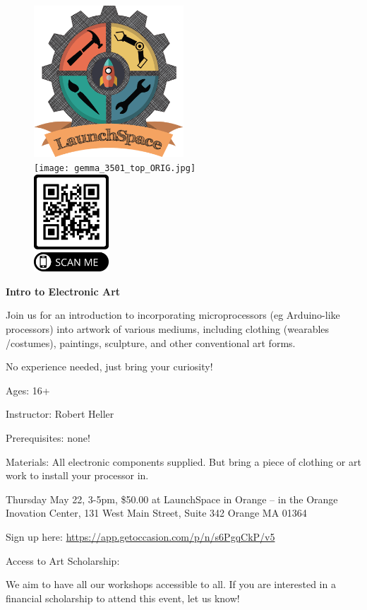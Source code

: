 \documentclass[12pt]{article}
\begin{document}
\begin{figure}
\centering
\includegraphics[width=0.5\textwidth]{Copy-of-launchSpace_Color-copy.png}\\
\vspace{12pt}
\texttt{[image: gemma\_3501\_top\_ORIG.jpg]}\\
\vspace{12pt}
\includegraphics[width=0.25\textwidth]{LaunchSpaceGemmaClass.png}
\end{figure}


{\LARGE \textbf{Intro to Electronic Art\\}}
 
{\Large

Join us for an introduction to incorporating microprocessors (eg Arduino-like 
processors) into artwork of various mediums, including clothing (wearables /costumes), paintings, sculpture, and other conventional art forms. 

No experience needed, just bring your curiosity!

Ages: 16+

Instructor: Robert Heller

Prerequisites: none!

Materials:  All electronic components supplied.  But bring a piece of clothing 
or art work to install your processor in. 

Thursday May 22, 3-5pm, \$50.00 at LaunchSpace in Orange -- in the Orange 
Inovation Center, 131 West Main Street, Suite 342
Orange MA 01364

}


Sign up here: \url{https://app.getoccasion.com/p/n/s6PgqCkP/v5} 

Access to Art Scholarship:

We aim to have all our workshops accessible to all. If you are interested in a 
financial scholarship to attend this event, let us know! 
\end{document}
